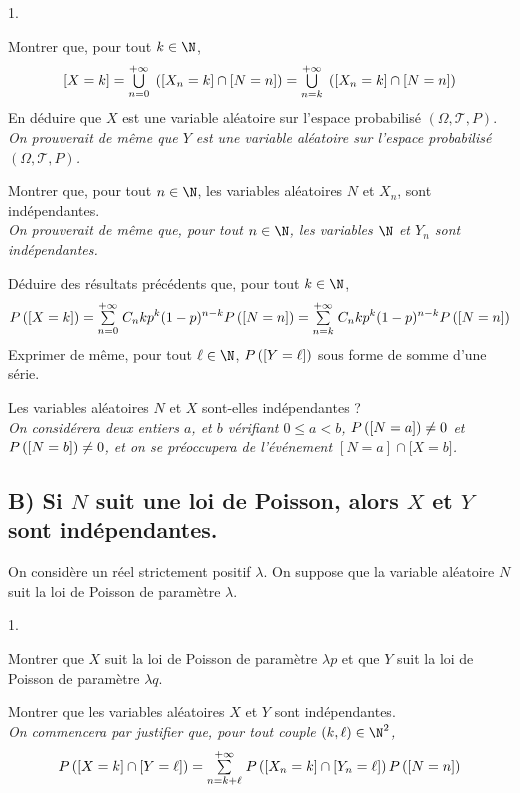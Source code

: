 \documentclass[11pt]{article}%
\begin{document}
\begin{noliste}{1.}
 \setlength{\itemsep}{4mm}
\item Montrer que, pour tout $k\in \N$, 
\[
\lbrack X = k] = {\textstyle\bigcup\limits_{n = 0}^{+ \infty }}\hspace{.1cm}\left( [X_{n} = k]\cap \lbrack
N = n]\right) = {\textstyle\bigcup\limits_{n = k}^{+ \infty }}\hspace{.1cm}\left( [X_{n} = k]\cap \lbrack
N = n]\right)
\]
En déduire que $X$ est une variable aléatoire sur l'espace probabilisé
$(\Omega,\mathcal{T},P)$.\\
\textsl{On prouverait de même que $Y$ est une variable aléatoire sur
l'espace probabilisé $(\Omega,\mathcal{T},P)$.}

\item Montrer que, pour tout $n\in \N$, les variables aléatoires $N$
et $X_{n}$, sont indépendantes.\\
\textsl{On prouverait de même que, pour tout $n\in \N$, les
variables $\N$ et $Y_{n}$ sont indépendantes.}

\item Déduire des résultats précédents que, pour tout $k\in \N$, 
\[
P\left(\left[ {X = k} \right]\right) = {\textstyle\sum\limits_{n = 0}^{+ \infty
}}\hspace{.1cm}C_{n}{k}p^{k}(1-p)^{n-k}P\left(\left[ {N = n} \right]\right) = {\textstyle\sum\limits_{n = k}^{+
\infty
}}\hspace{.1cm}C_{n}{k}p^{k}(1-p)^{n-k}P\left(\left[ {N = n} \right]\right)
\]
Exprimer de même, pour tout $\ell \in \N$, $P\left(\left[ {Y = \ell
} \right]\right)$ sous forme
de somme d'une série.

\item Les variables aléatoires $N$ et $X$ sont-elles indépendantes ?\\
\textsl{On considérera deux entiers $a$, et $b$ vérifiant $0\leq a<b$,
$P\left(\left[ {N = a} \right]\right)\not = 0$ et $P\left(\left[ {N = b} \right]\right)\not =
0$, et on se préoccupera de l'événement $[N = a]\cap \lbrack X = b]$.}
\end{noliste}

\subsection*{B) Si $N$ suit une loi de Poisson, alors $X$ et $Y$ sont
indépendantes.}

On considère un réel strictement positif $\lambda$. On suppose que la
variable aléatoire $N$ suit la loi de Poisson de paramètre $\lambda$.

\begin{noliste}{1.}
 \setlength{\itemsep}{4mm}
\item Montrer que $X$ suit la loi de Poisson de paramètre $\lambda p$
et que 
$Y$ suit la loi de Poisson de paramètre $\lambda q$.

\item Montrer que les variables aléatoires $X$ et $Y$ sont
indépendantes.\\
\textsl{On commencera par justifier que, pour tout couple $(k,\ell )\in

\N^{2}$,} 
\[
P\left( [X = k]\cap \lbrack Y = \ell ]\right) = \Sum{n = k + \ell }{+
\infty
}P\left( [X_{n} = k]\cap \lbrack Y_{n} = \ell ]\right) P\left(\Ev{N =
n}\right)
\]
\end{noliste}
\end{document}
